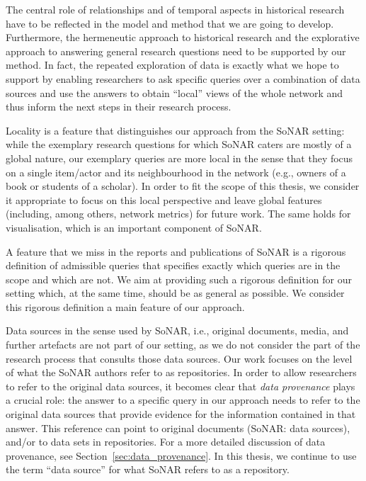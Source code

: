 The central role of relationships and of temporal aspects in historical research
have to be reflected in the model and method that we are going to develop.
Furthermore, the hermeneutic approach to historical research
and the explorative approach to answering general research questions 
need to be supported by our method. In fact, the repeated exploration of data
is exactly what we hope to support by enabling researchers to ask specific
queries over a combination of data sources and use the answers to obtain
\enquote{local} views of the whole network and thus inform the next steps in their research process.

Locality is a feature that distinguishes our approach from the SoNAR setting:
while the exemplary research questions for which SoNAR caters are mostly of a global nature,
our exemplary queries are more local in the sense that they focus on
a single item/actor and its neighbourhood in the network
(e.g., owners of a book or students of a scholar). 
In order to fit the scope of this thesis,
we consider it appropriate to focus on this local perspective
and leave global features (including, among others, network metrics)
for future work. The same holds for visualisation, which is an important component
of SoNAR.

A feature that we miss in the reports and publications of SoNAR is a rigorous definition of admissible queries
that specifies exactly which queries are in the scope and which are not.
We aim at providing such a rigorous definition for our setting
which, at the same time, should be as general as possible. We consider this rigorous definition
a main feature of our approach.

Data sources in the sense used by SoNAR, i.e., original documents, media, and further artefacts
are not part of our setting, as we do not consider the part of the research process
that consults those data sources. Our work focuses on the level of
what the SoNAR authors refer to as repositories.
In order to allow researchers to refer to the original data sources,
it becomes clear that \emph{data provenance} plays a crucial role:
the answer to a specific query in our approach needs to refer to
the original data sources that provide evidence for the information contained in that answer.
This reference can point to original documents (SoNAR: data sources),
and/or to data sets in repositories. For a more detailed discussion of data provenance,
see Section~\ref{sec:data_provenance}.
In this thesis, we continue to use the term \enquote{data source} for what
SoNAR refers to as a repository.

